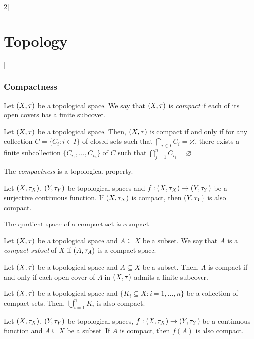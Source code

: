 \documentclass[../../../main.tex]{subfiles}
\begin{document}
\begin{multicols}{2}[\section{Topology}]
  \subsubsection{Compactness}
  \begin{definition}
    Let $(X,\tau)$ be a topological space. We say that $(X,\tau)$ is \emph{compact} if each of its open covers has a finite subcover.
  \end{definition}
  \begin{prop}
    Let $(X,\tau)$ be a topological space. Then, $(X,\tau)$ is compact if and only if for any collection $C=\{C_i:i\in I\}$ of closed sets such that $\bigcap_{i\in I} C_i=\varnothing$, there exists a finite subcollection $\{C_{i_1},\ldots,C_{i_n}\}$ of $C$ such that $\bigcap_{j=1}^n C_{i_j}=\varnothing$
  \end{prop}
  \begin{prop}
    The \emph{compactness} is a topological property.
  \end{prop}
  \begin{prop}
    Let $(X,\tau_X)$, $(Y,\tau_Y)$ be topological spaces and $f:(X,\tau_X)\rightarrow(Y,\tau_Y)$ be a surjective continuous function. If $(X,\tau_X)$ is compact, then $(Y,\tau_Y)$ is also compact.
  \end{prop}
  \begin{corollary}
    The quotient space of a compact set is compact.
  \end{corollary}
  \begin{definition}
    Let $(X,\tau)$ be a topological space and $A\subseteq X$ be a subset. We say that $A$ is a \emph{compact subset} of $X$ if $(A,\tau_A)$ is a compact space.
  \end{definition}
  \begin{lemma}
    Let $(X,\tau)$ be a topological space and $A\subseteq X$ be a subset. Then, $A$ is compact if and only if each open cover of $A$ in $(X,\tau)$ admits a finite subcover.
  \end{lemma}
  \begin{prop}
    Let $(X,\tau)$ be a topological space and $\{K_i\subseteq X:i=1,\ldots,n\}$ be a collection of compact sets. Then, $\bigcup_{i=1}^nK_i$ is also compact.
  \end{prop}
  \begin{theorem}
    Let $(X,\tau_X)$, $(Y,\tau_Y)$ be topological spaces, $f:(X,\tau_X)\rightarrow(Y,\tau_Y)$ be a continuous function and $A\subseteq X$ be a subset. If $A$ is compact, then $f(A)$ is also compact.

\end{theorem}
\end{multicols}
\end{document}
